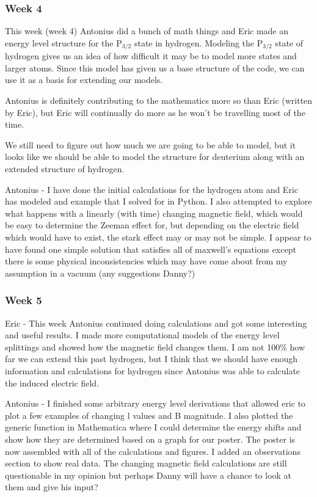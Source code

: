 \documentclass[11pt]{article}
\begin{document}
\subsubsection*{Week 4}

This week (week 4) Antonius did a bunch of math things and Eric made an energy level structure for the P$_{3/2}$ state in hydrogen.  Modeling the P$_{3/2}$ state of hydrogen gives us an idea of how difficult it may be to model more states and larger atoms.  Since this model has given us a base structure of the code, we can use it as a basis for extending our models.

Antonius is definitely contributing to the mathematics more so than Eric (written by Eric), but Eric will continually do more as he won't be travelling most of the time.

We still need to figure out how much we are going to be able to model, but it looks like we should be able to model the structure for deuterium along with an extended structure of hydrogen.

Antonius - I have done the initial calculations for the hydrogen atom and Eric has modeled and example that I solved for in Python. I also attempted to explore what happens with a linearly (with time) changing magnetic field, which would be easy to determine the Zeeman effect for, but depending on the electric field which would have to exist, the stark effect may or may not be simple. I appear to have found one simple solution that satisfies all of maxwell's equations except there is some physical inconsistencies which may have come about from my assumption in a vacuum (any suggestions Danny?)


\subsubsection*{Week 5}
Eric - This week Antonius continued doing calculations and got some interesting and useful results.  I made more computational models of the energy level splittings and showed how the magnetic field changes them.  I am not 100\% how far we can extend this past hydrogen, but I think that we should have enough information and calculations for hydrogen since Antonius was able to calculate the induced electric field.

Antonius - I finished some arbitrary energy level derivations that allowed eric to plot a few examples of changing l values and B magnitude. I also plotted the generic function in Mathematica where I could determine the energy shifts and show how they are determined based on a graph for our poster. The poster is now assembled with all of the calculations and figures. I added an observations section to show real data. The changing magnetic field calculations are still questionable in my opinion but perhaps Danny will have a chance to look at them and give his input?

\end{document}
